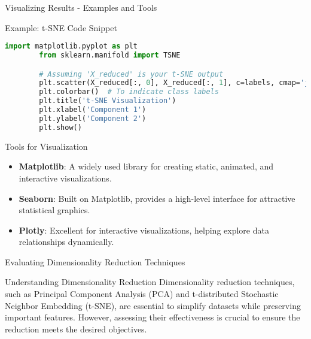 \documentclass[aspectratio=169]{beamer}
\begin{document}
\begin{frame}[fragile]{Visualizing Results - Examples and Tools}
    \begin{block}{Example: t-SNE Code Snippet}
        \begin{lstlisting}[language=Python]
        import matplotlib.pyplot as plt
        from sklearn.manifold import TSNE

        # Assuming 'X_reduced' is your t-SNE output
        plt.scatter(X_reduced[:, 0], X_reduced[:, 1], c=labels, cmap='jet', alpha=0.5)
        plt.colorbar()  # To indicate class labels
        plt.title('t-SNE Visualization')
        plt.xlabel('Component 1')
        plt.ylabel('Component 2')
        plt.show()
        \end{lstlisting}
    \end{block}
    
    \begin{block}{Tools for Visualization}
        \begin{itemize}
            \item \textbf{Matplotlib}: A widely used library for creating static, animated, and interactive visualizations.
            \item \textbf{Seaborn}: Built on Matplotlib, provides a high-level interface for attractive statistical graphics.
            \item \textbf{Plotly}: Excellent for interactive visualizations, helping explore data relationships dynamically.
        \end{itemize}
    \end{block}
\end{frame}

\begin{frame}{Evaluating Dimensionality Reduction Techniques}
  \begin{block}{Understanding Dimensionality Reduction}
    Dimensionality reduction techniques, such as Principal Component Analysis (PCA) and t-distributed Stochastic Neighbor Embedding (t-SNE), are essential to simplify datasets while preserving important features. However, assessing their effectiveness is crucial to ensure the reduction meets the desired objectives.
  \end{block}
\end{frame}
\end{document}
